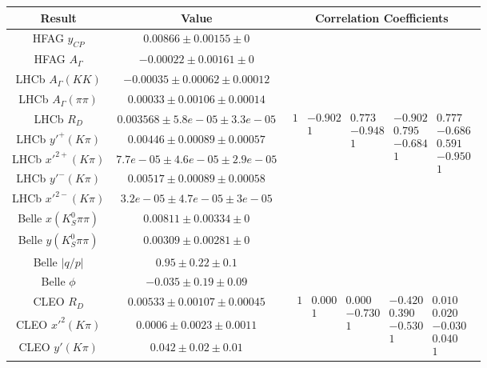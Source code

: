 \begin{table}[htdp]
\begin{center}
\begin{tabular}{|c|c|c|}
\hline
Result & Value & Correlation Coefficients \\
\hline \hline
HFAG $ y_{CP}$ & $0.00866\pm0.00155\pm0$ & \\
HFAG $ A_\Gamma$ & $-0.00022\pm0.00161\pm0$ & \\
\hline
LHCb $ A_\Gamma(KK)$ & $-0.00035\pm0.00062\pm0.00012$ & \\
LHCb $ A_\Gamma(\pi\pi)$ & $0.00033\pm0.00106\pm0.00014$ & \\
\hline
LHCb $ R_D$ & $0.003568\pm5.8e-05\pm3.3e-05$ & \multirow{5}{*}{$\begin{array}{ccccc} 1 & -0.902 & 0.773& -0.902 & 0.777 \\& 1 &-0.948 & 0.795&  -0.686 \\ & & 1& -0.684 & 0.591\\ & & & 1 &-0.950 \\  & & & & 1\end{array}$}\\
LHCb $y'^+(K\pi)$ & $0.00446\pm0.00089\pm0.00057$ &   \\
LHCb $ x'^{2+}(K\pi)$ & $7.7e-05\pm4.6e-05\pm2.9e-05$ &\\
LHCb $y'^-(K\pi)$ & $0.00517\pm0.00089\pm0.00058$ & \\
LHCb $ x'^{2-}(K\pi)$ & $3.2e-05\pm4.7e-05\pm3e-05$ & \\
\hline
Belle $x(K_S^0\pi\pi)$ & $0.00811\pm0.00334\pm0$ & \\
Belle $y(K_S^0\pi\pi)$ & $0.00309\pm0.00281\pm0$ & \\
Belle $|q/p|$ & $0.95\pm0.22\pm0.1$ & \\
Belle $\phi$ & $-0.035\pm0.19\pm0.09$ & \\
\hline
CLEO $ R_D$ & $0.00533\pm0.00107\pm0.00045$ & \multirow{5}{*}{$\begin{array}{ccccc} 1 & 0.000 & 0.000 & -0.420 & 0.010\\ & 1 & -0.730 & 0.390 & 0.020 \\ & & 1 &-0.530 & -0.030\\ & & & 1& 0.040\\ & & & &1\end{array}$}\\
CLEO $ x'^2(K\pi)$ & $0.0006\pm0.0023\pm0.0011$ & \\
CLEO $y'(K\pi)$ & $0.042\pm0.02\pm0.01$ & \\

\end{tabular}
\end{center}
\end{table}
